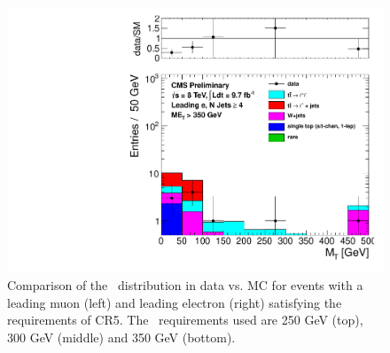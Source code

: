 \begin{figure}[hbt]
\begin{center}
        \includegraphics[width=0.5\linewidth]{plots/CR5plots/mt_met350_leadele_nj4.pdf}
    \caption{
      Comparison of the \mt\ distribution in data vs. MC for events
      with a leading muon (left) and leading electron (right)
      satisfying the requirements of CR5. The \met\ requirements used are
      250 GeV (top), 300 GeV (middle) and 350 GeV (bottom).
\label{fig:cr5mtrest2} 
}  
      \end{center}
\end{figure}


\clearpage


